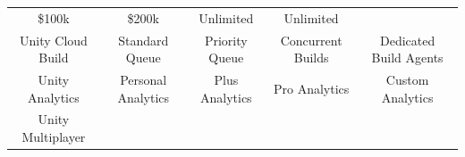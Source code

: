 \documentclass[12pt]{article}
\begin{document}
\begin{longtable}[]{@{}ccccc@{}}
\begin{minipage}[t]{0.18\columnwidth}
\$100k\strut
\end{minipage} & \begin{minipage}[t]{0.14\columnwidth}\centering\strut
\$200k\strut
\end{minipage} & \begin{minipage}[t]{0.14\columnwidth}\centering\strut
Unlimited\strut
\end{minipage} & \begin{minipage}[t]{0.23\columnwidth}\centering\strut
Unlimited\strut
\end{minipage}\tabularnewline
\begin{minipage}[t]{0.18\columnwidth}\centering\strut
Unity Cloud Build\strut
\end{minipage} & \begin{minipage}[t]{0.18\columnwidth}\centering\strut
Standard Queue\strut
\end{minipage} & \begin{minipage}[t]{0.14\columnwidth}\centering\strut
Priority Queue\strut
\end{minipage} & \begin{minipage}[t]{0.14\columnwidth}\centering\strut
Concurrent Builds\strut
\end{minipage} & \begin{minipage}[t]{0.23\columnwidth}\centering\strut
Dedicated Build Agents\strut
\end{minipage}\tabularnewline
\begin{minipage}[t]{0.18\columnwidth}\centering\strut
Unity Analytics\strut
\end{minipage} & \begin{minipage}[t]{0.18\columnwidth}\centering\strut
Personal Analytics\strut
\end{minipage} & \begin{minipage}[t]{0.14\columnwidth}\centering\strut
Plus Analytics\strut
\end{minipage} & \begin{minipage}[t]{0.14\columnwidth}\centering\strut
Pro Analytics\strut
\end{minipage} & \begin{minipage}[t]{0.23\columnwidth}\centering\strut
Custom Analytics\strut
\end{minipage}\tabularnewline
\begin{minipage}[t]{0.18\columnwidth}\centering\strut
Unity Multiplayer\strut
\end{minipage} & \begin{minipage}[t]{0.18\columnwidth}\centering\strut

\end{minipage}
\end{longtable}
\end{document}
